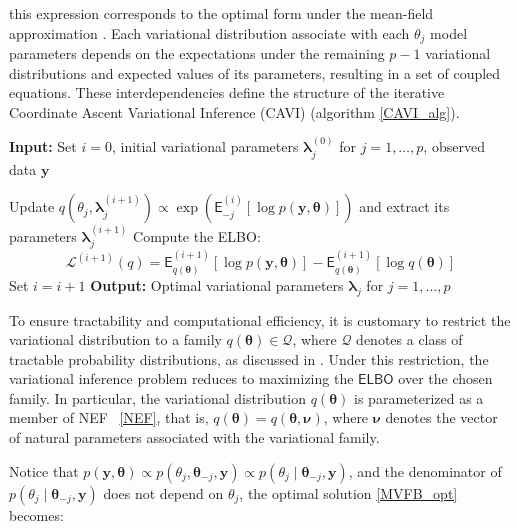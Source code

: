 this expression corresponds to the optimal form under the mean-field approximation \cite{BISHOP}. Each variational distribution associate with each $\theta_j$ model parameters depends on the expectations under the remaining \( p-1 \) variational distributions and expected values of its parameters, resulting in a set of coupled equations. These interdependencies define the structure of the iterative Coordinate Ascent Variational Inference (CAVI) (algorithm \ref{CAVI_alg}).

\begin{algorithm}[H]
\caption{Coordinate Ascent Variational Inference (CAVI)}
\label{CAVI_alg}
\begin{algorithmic}
\Statex \textbf{Input:} Set $i = 0$, initial variational parameters 
$\bm{\lambda}_j^{(0)}$ for $j = 1,\dots,p$, observed data $\bm{y}$

        \State  Update $q\left(\theta_j,\bm{\lambda}_j^{(i+1)}\right)\propto\exp{\left(\mathsf{E}_{{-j}}^{(i)}\left[\log{p(\bm{y},\bm{\theta})}\right]\right)}$ and extract its parameters
        $\bm{\lambda}_j^{(i+1)}$
    \EndFor
    \State Compute the ELBO:
    $$
    \mathcal{L}^{(i+1)}\left(q\right)
    =
    \mathsf{E}^{(i+1)}_{q(\bm{\theta})}\left[\log p(\bm{y},\bm{\theta})\right]
    -
    \mathsf{E}^{(i+1)}_{q(\bm{\theta})}\left[\log q(\bm{\theta})\right]
    $$
    \State Set $i =  i + 1$
\EndWhile
\Statex \textbf{Output:} Optimal variational parameters 
$\bm{\lambda}_j$ for $j = 1,\dots,p$
\end{algorithmic}
\end{algorithm}

To ensure tractability and computational efficiency, it is customary to restrict the variational distribution to a family $q(\bm{\theta}) \in \bm{\mathcal{Q}}$, where $\bm{\mathcal{Q}}$ denotes a class of tractable probability distributions, as discussed in \cite{HOFFMAN}. Under this restriction, the variational inference problem reduces to maximizing the $\mathsf{ELBO}$ over the chosen family. In particular, the variational distribution $q(\bm{\theta})$ is parameterized as a member of NEF ~\eqref{NEF}, that is, $q(\bm{\theta}) = q(\bm{\theta}, \bm{\nu})$, where $\bm{\nu}$ denotes the vector of natural parameters associated with the variational family.

\newpage

Notice that $p(\bm{y},\bm{\theta})  \propto p(\theta_j, \bm{\theta}_{-j},\bm{y}) \propto p(\theta_j\mid \bm{\theta}_{-j},\bm{y})$, and the denominator of $p(\theta_j\mid \bm{\theta}_{-j},\bm{y})$ does not depend on $\theta_j$, the optimal solution \ref{MVFB_opt} becomes:

